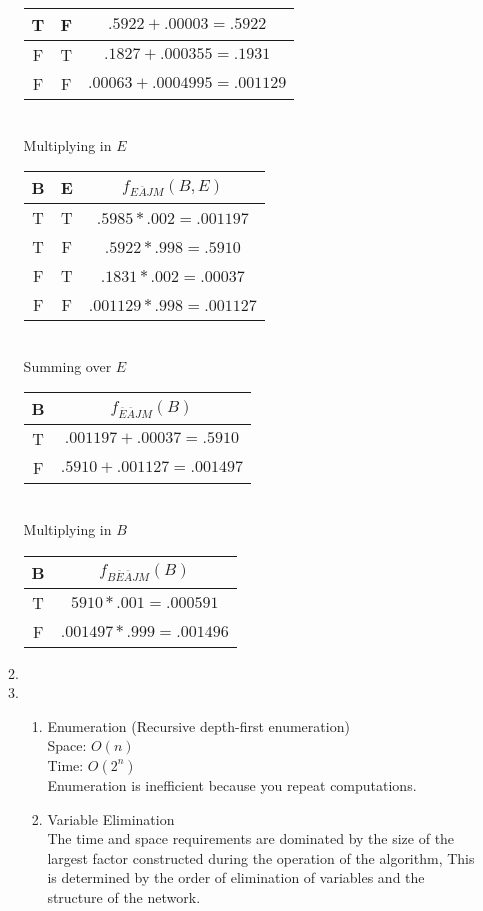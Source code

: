 \documentclass[12pt,a4paper]{report}
\begin{document}
\begin{enumerate}
\begin{enumerate}
\begin{tabular}{| c | c | c |}
T & F & $.5922 + .00003 = .5922$ \\ \hline
F & T & $.1827 + .000355 = .1931$ \\ \hline
F & F & $.00063 + .0004995 = .001129$ \\ \hline
\end{tabular}\\
Multiplying in $E$\\
\begin{tabular}{| c | c | c |}
\hline
B & E & $f_{E\overline{A}JM}(B, E)$ \\ \hline
T & T & $.5985 * .002 = .001197$ \\ \hline
T & F & $.5922 * .998 = .5910$ \\ \hline
F & T & $.1831 * .002 = .00037$ \\ \hline
F & F & $.001129 * .998 = .001127$ \\ \hline
\end{tabular}\\
Summing over $E$\\
\begin{tabular}{| c | c |}
  \hline
  B& $f_{\overline{E}\overline{A}JM}(B)$ \\ \hline
  T & $.001197 + .00037 = .5910$ \\ \hline
  F & $.5910 + .001127 = .001497$ \\ \hline
\end{tabular}\\
Multiplying in $B$\\
\begin{tabular}{| c | c |}
  \hline
  B& $f_{B\overline{E}\overline{A}JM}(B)$ \\ \hline
  T & $5910 * .001 = .000591$ \\ \hline
  F & $.001497 * .999 = .001496$ \\ \hline
\end{tabular}



\item

\item
\begin{enumerate}
\item
Enumeration (Recursive depth-first enumeration)\\
Space: $O(n)$\\
Time: $O(2^n)$\\
Enumeration is inefficient because you repeat computations.\\
\item
Variable Elimination\\
The time and space requirements are dominated by the size of the largest factor constructed during the operation of the algorithm, This is determined by the order of elimination of variables and the structure of the network.\\
\end{enumerate}


\end{enumerate}
\end{enumerate}
\end{document}
